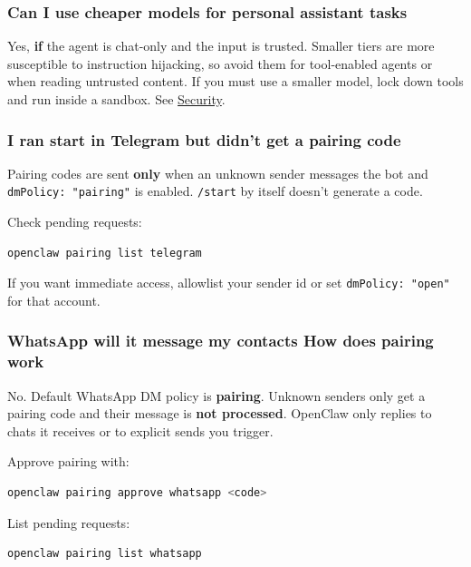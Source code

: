 \subsubsection{Can I use cheaper models for personal assistant tasks}


Yes, \textbf{if} the agent is chat-only and the input is trusted. Smaller tiers are
more susceptible to instruction hijacking, so avoid them for tool-enabled agents
or when reading untrusted content. If you must use a smaller model, lock down
tools and run inside a sandbox. See \href{/gateway/security}{Security}.

\subsubsection{I ran start in Telegram but didn't get a pairing code}


Pairing codes are sent \textbf{only} when an unknown sender messages the bot and
\texttt{dmPolicy: "pairing"} is enabled. \texttt{/start} by itself doesn't generate a code.

Check pending requests:

\begin{lstlisting}[language=bash]
openclaw pairing list telegram
\end{lstlisting}


If you want immediate access, allowlist your sender id or set \texttt{dmPolicy: "open"}
for that account.

\subsubsection{WhatsApp will it message my contacts How does pairing work}


No. Default WhatsApp DM policy is \textbf{pairing}. Unknown senders only get a pairing code and their message is \textbf{not processed}. OpenClaw only replies to chats it receives or to explicit sends you trigger.

Approve pairing with:

\begin{lstlisting}[language=bash]
openclaw pairing approve whatsapp <code>
\end{lstlisting}


List pending requests:

\begin{lstlisting}[language=bash]
openclaw pairing list whatsapp
\end{lstlisting}



